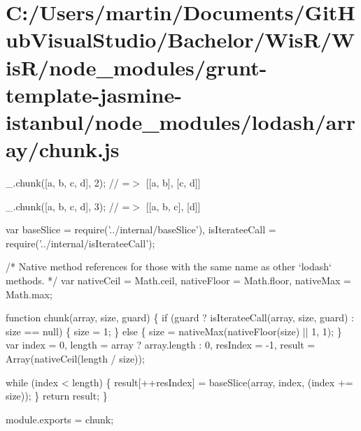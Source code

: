 \hypertarget{_c_1_2_users_2martin_2_documents_2_git_hub_visual_studio_2_bachelor_2_wis_r_2_wis_r_2node_module33d0d7492b0d375618362eed378ac87d}{}\section{C\+:/\+Users/martin/\+Documents/\+Git\+Hub\+Visual\+Studio/\+Bachelor/\+Wis\+R/\+Wis\+R/node\+\_\+modules/grunt-\/template-\/jasmine-\/istanbul/node\+\_\+modules/lodash/array/chunk.\+js}
\+\_\+.\+chunk(\mbox{[}\textquotesingle{}a\textquotesingle{}, \textquotesingle{}b\textquotesingle{}, \textquotesingle{}c\textquotesingle{}, \textquotesingle{}d\textquotesingle{}\mbox{]}, 2); // =$>$ \mbox{[}\mbox{[}\textquotesingle{}a\textquotesingle{}, \textquotesingle{}b\textquotesingle{}\mbox{]}, \mbox{[}\textquotesingle{}c\textquotesingle{}, \textquotesingle{}d\textquotesingle{}\mbox{]}\mbox{]}

\+\_\+.\+chunk(\mbox{[}\textquotesingle{}a\textquotesingle{}, \textquotesingle{}b\textquotesingle{}, \textquotesingle{}c\textquotesingle{}, \textquotesingle{}d\textquotesingle{}\mbox{]}, 3); // =$>$ \mbox{[}\mbox{[}\textquotesingle{}a\textquotesingle{}, \textquotesingle{}b\textquotesingle{}, \textquotesingle{}c\textquotesingle{}\mbox{]}, \mbox{[}\textquotesingle{}d\textquotesingle{}\mbox{]}\mbox{]}


\begin{DoxyCodeInclude}
var baseSlice = require(\textcolor{stringliteral}{'../internal/baseSlice'}),
    isIterateeCall = require(\textcolor{stringliteral}{'../internal/isIterateeCall'});

\textcolor{comment}{/* Native method references for those with the same name as other `lodash` methods. */}
var nativeCeil = Math.ceil,
    nativeFloor = Math.floor,
    nativeMax = Math.max;

\textcolor{keyword}{function} chunk(array, size, guard) \{
  \textcolor{keywordflow}{if} (guard ? isIterateeCall(array, size, guard) : size == null) \{
    size = 1;
  \} \textcolor{keywordflow}{else} \{
    size = nativeMax(nativeFloor(size) || 1, 1);
  \}
  var index = 0,
      length = array ? array.length : 0,
      resIndex = -1,
      result = Array(nativeCeil(length / size));

  \textcolor{keywordflow}{while} (index < length) \{
    result[++resIndex] = baseSlice(array, index, (index += size));
  \}
  \textcolor{keywordflow}{return} result;
\}

module.exports = chunk;
\end{DoxyCodeInclude}
 